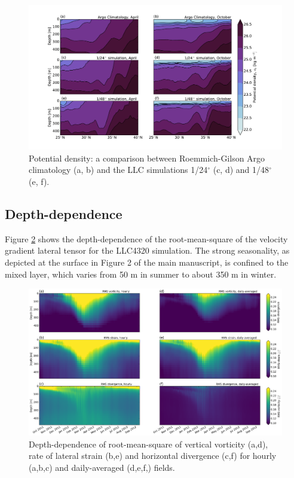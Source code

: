\documentclass[grl]{agutex2015}
\begin{document}
\begin{article}
\begin{figure}[ht]
   \begin{center}
     \includegraphics[width=1.\textwidth]{figs/fig_s2_1.pdf}
  \caption{Potential density: a comparison between Roemmich-Gilson Argo
          climatology (a, b) and the LLC simulations 1/24$^\circ$ (c, d)
          and  1/48$^\circ$ (e, f).}
  \label{figS2_1}
  \end{center}
\end{figure}

\subsection*{Depth-dependence}
Figure \ref{figS2_2} shows the depth-dependence of the  root-mean-square of the velocity
gradient lateral tensor for the LLC4320 simulation. The strong seasonality, as depicted
at the surface in Figure 2 of the main manuscript, is confined to the mixed layer, which
varies from 50 m in summer to about 350 m in winter.

\begin{figure}[ht]
   \begin{center}
     \includegraphics[width=.9\textwidth]{figs/fig_s2_2.png}
  \caption{Depth-dependence of root-mean-square of vertical vorticity (a,d), rate of lateral strain (b,e)
  and horizontal divergence (c,f) for hourly (a,b,c) and daily-averaged (d,e,f,) fields.}
  \label{figS2_2}
  \end{center}
\end{figure}


\end{article}
\end{document}
